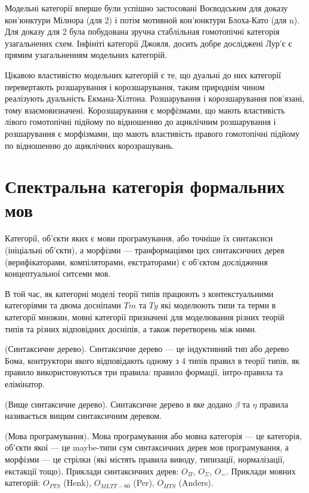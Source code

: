 Модельні категорії вперше були успішно застосовані Воєводським для доказу
кон'юнктури Мілнора (для 2) і потім мотивной кон'юнктури Блоха-Като (для n).
Для доказу для 2 була побудована зручна стаблільная гомотопічні категорія
узагальнених схем. Інфініті категорії Джояля, досить добре досліджені Лур'є
є прямим узагальненням модельних категорій.

Цікавою властивістю модельних категорій є те, що дуальні до них категорії
перевертають розшарування і корозшарування, таким природнім чином реалізують
дуальність Екмана-Хілтона. Розшарування і корозшарування пов'язані, тому взаємовизначені.
Корозшарування є морфізмами, що мають властивість лівого гомотопічні
підйому по відношенню до ациклічним розшарування і розшарування є морфізмами,
що мають властивість правого гомотопічні підйому по відношенню до ациклічних корозрашувань.

\newpage
\section{Спектральна категорія формальних мов}
Категорії, об'єкти яких є мови програмування, або точніше їх синтаксиси (ініціальні об'єкти), а
морфізми --- транформаціями цих синтаксичних дерев (верифікаторами, компіляторами, екстраторами)
є об'єктом дослідження концептуальної ситсеми мов.

В той час, як категорні моделі теорії типів працюють з контекстуальними категоріями
та двома досніпами $Tm$ та $Ty$ які моделюють типи та терми в категорії множин,
мовні категорії призначені для моделювання різних теорій типів та різних
відповідних досніпів, а також перетворень між ними.

\begin{definition} (Синтаксичне дерево).
Синтаксичне дерево --- це індуктивний тип або дерево Бома,
контруктори якого відповідають одному з 4 типів правил в теорії типів,
як правило використовуються три правила: правило формації, інтро-правила та елімінатор.
\end{definition}

\begin{definition} (Вище синтаксичне дерево).
Синтаксичне дерево в яке додано $\beta$ та $\eta$ правила називається
вищим синтаксичним деревом.
\end{definition}

\begin{definition} (Мова програмування).
Мова програмування або мовна категорія --- це категорія,
об’єкти якої --- це maybe-типи сум синтаксичних дерев мов програмування,
  а морфізми --- це стрілки (які містять правила виводу, типизації, нормалізації, екстакції тощо).
Приклади синтаксичних дерев: $O_\Pi$, $O_\Sigma$, $O_=$.
Приклади мовних категорій: $O_{PTS}$ (Henk), $O_{MLTT-80}$ (Per), $O_{HTS}$ (Anders).
\end{definition}

